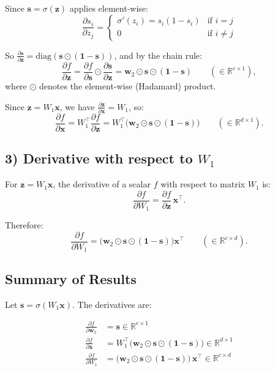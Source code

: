 \documentclass{article}
\begin{document}
Since $\mathbf{s} = \sigma(\mathbf{z})$ applies element-wise:
\[
\frac{\partial s_i}{\partial z_j} = 
\begin{cases}
\sigma'(z_i) = s_i(1-s_i) & \text{if } i=j\\
0 & \text{if } i\neq j
\end{cases}
\]

So $\frac{\partial \mathbf{s}}{\partial \mathbf{z}} = \text{diag}(\mathbf{s}\odot(\mathbf{1}-\mathbf{s}))$, and by the chain rule:
\[
\frac{\partial f}{\partial \mathbf{z}}
=
\frac{\partial f}{\partial \mathbf{s}}\odot \frac{\partial \mathbf{s}}{\partial \mathbf{z}}
=
\mathbf{w}_2 \odot \mathbf{s} \odot (\mathbf{1}-\mathbf{s})
\qquad (\in \mathbb{R}^{c\times 1}),
\]
where $\odot$ denotes the element-wise (Hadamard) product.

Since $\mathbf{z}=W_1 \mathbf{x}$, we have $\frac{\partial \mathbf{z}}{\partial \mathbf{x}} = W_1$, so:
\[
\boxed{\frac{\partial f}{\partial \mathbf{x}}
=
W_1^\top \frac{\partial f}{\partial \mathbf{z}}
=
W_1^\top \bigl(\mathbf{w}_2 \odot \mathbf{s} \odot (\mathbf{1}-\mathbf{s})\bigr)}
\qquad (\in \mathbb{R}^{d\times 1}).
\]

\subsection*{3) Derivative with respect to $W_1$}

For $\mathbf{z}=W_1\mathbf{x}$, the derivative of a scalar $f$ with respect to matrix $W_1$ is:
\[
\frac{\partial f}{\partial W_1}
=
\frac{\partial f}{\partial \mathbf{z}} \, \mathbf{x}^\top.
\]

Therefore:
\[
\boxed{\frac{\partial f}{\partial W_1}
=
\bigl(\mathbf{w}_2 \odot \mathbf{s} \odot (\mathbf{1}-\mathbf{s})\bigr) \mathbf{x}^\top}
\qquad (\in \mathbb{R}^{c\times d}).
\]

\subsection*{Summary of Results}

Let $\mathbf{s}=\sigma(W_1\mathbf{x})$. The derivatives are:

\begin{align*}
\frac{\partial f}{\partial \mathbf{w}_2} &= \mathbf{s} \in \mathbb{R}^{c\times 1}\\[6pt]
\frac{\partial f}{\partial \mathbf{x}} &= W_1^\top\bigl(\mathbf{w}_2\odot \mathbf{s}\odot(\mathbf{1}-\mathbf{s})\bigr) \in \mathbb{R}^{d\times 1}\\[6pt]
\frac{\partial f}{\partial W_1} &= \bigl(\mathbf{w}_2\odot \mathbf{s}\odot(\mathbf{1}-\mathbf{s})\bigr)\,\mathbf{x}^\top \in \mathbb{R}^{c\times d}
\end{align*}
\end{document}
